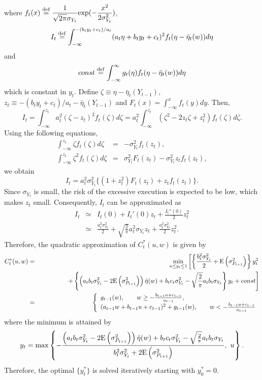 where $\displaystyle f_t(x) \stackrel{\mathrm{def}}{=} \frac{1}{\sqrt{2\pi}\sigma_{Y_t}}\mathrm{exp}(-\frac{x^2}{2\sigma_{Y_t}^2})$,
\[
 I_t \stackrel{\mathrm{def}}{=} \int_{-\infty}^{-(b_t y_t + c_t)/a_t} (a_t \eta + b_t y_t + c_t )^2
        f_t(\eta - \bar \eta_t(w)) d \eta
\]
and
\[
 const \stackrel{\mathrm{def}}{=} \int_{-\infty}^\infty g_t (\eta) f_t(\eta - \bar \eta_t(w)) d \eta
\]
which is constant in $y_t$.
Define $\zeta \equiv \eta-\bar \eta_t(Y_{t-1})$, $z_t \equiv -(b_ty_t+c_t)/a_t-
\bar\eta_t(Y_{t-1})$ and $\displaystyle F_t(x)= \int_{-\infty}^x f_t(y) dy$.
Then,
\[ %
  I_t = \int_{-\infty}^{z_t}a_t^2(\zeta-z_t)^2f_t(\zeta)d\zeta = a_t^2 \int_{-
\infty}^{z_t} (\zeta^2-2z_t\zeta+z_t^2)f_t(\zeta)d\zeta.
\] %
Using the following equations,
\begin{eqnarray*}
  \int_{-\infty}^{z_t} \zeta f_t(\zeta)d\zeta & = & -\sigma_{Y_t}^2 
f_t(z_t),\label{eq_d14}\\
  \int_{-\infty}^{z_t} \zeta^2 f_t(\zeta)d\zeta & = & \sigma_{Y_t}^2 F_t(z_t)-
\sigma_{Y_t}^2 z_t f_t(z_t),\label{eq_d15}
\end{eqnarray*}
we obtain
\[
  I_t =  a_t^2 \sigma_{Y_t}^2 \{(1+z_t^2)F_t(z_t)+z_t f_t(z_t)\}.
\]
Since $\sigma_{Y_t}$ is small, the risk of the excessive execution is expected to be low, which makes $z_t$ small.  Consequently, $I_t$ can be approximated as
\begin{eqnarray*}
  I_t & \simeq & I_t(0)+I_t'(0)z_t+\frac{I_t''(0)}{2}z_t^2 \\
      & \simeq & \frac{a_t^2 \sigma_{Y_t}^2}{2}+\sqrt{\frac{2}{\pi}}a_t^2 
\sigma_{Y_t}z_t+\frac{a_t^2 \sigma_{Y_t}^2}{2}z_t^2.
\end{eqnarray*}
Therefore, the quadratic approximation of $C_t^*(u,w)$ is given by 
\begin{eqnarray*} %
 C_t^*(u,w)
  & = & \min_{u \leq y_t \leq 1} \left[
        \left\{ \frac{b_t^2 \sigma_{Y_t}^2}{2}+\ex{\sigma_{P_{t+1}}^2} \right\} y_t^2 \right. \\
  &   & \hspace*{1.5cm}
        \left. +\left\{\left(a_tb_t\sigma_{Y_t}^2-2\ex{\sigma_{P_{t+1}}^2}\right)\bar \eta(w) 
        +b_tc_t\sigma_{Y_t}^2-\sqrt{\frac{2}{\pi}}a_tb_t\sigma_{Y_t}\right\}y_t+const \right] \\
  & = & \left\{
  \begin{array}{ll}
   g_{t-1}(w), \qquad w \geq -\frac{b_{t-1}u+c_{t-1}}{a_{t-1}},\\
   (a_{t-1}w+b_{t-1}u+c_{t-1})^2+g_{t-1}(w),
   \qquad w < -\frac{b_{t-1}u+c_{t-1}}{a_{t-1}}
  \end{array}
  \right.
\end{eqnarray*} %
where the minimum is attained by
\[
  y_t= \max\left\{-\frac{\left(a_tb_t\sigma_{Y_t}^2-2{\mathrm{E}}\left( \sigma_{P_{t+1}}^2 \right)\right)
   \bar \eta(w)+b_tc_t\sigma_{Y_t}^2-\sqrt{\frac{2}{\pi}}a_tb_t\sigma_{Y_t}}{b_t^2 
   \sigma_{Y_t}^2+2{\mathrm{E}}\left( \sigma_{P_{t+1}}^2 \right)}, \ u \right\}.
\] %
Therefore, the optimal $\{ y_t^* \}$ is solved iteratively starting with $y_0^* = 0$.

